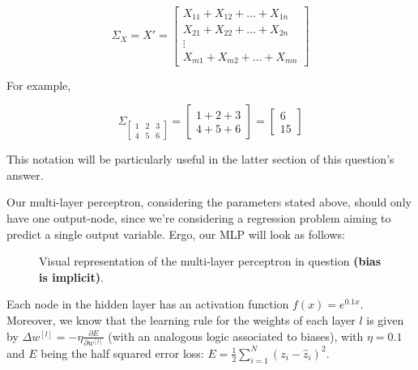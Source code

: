 \documentclass[12pt]{article}
\begin{document}
\begin{enumerate}[leftmargin=\labelsep]
        $$
          \Sigma_X = X' = \begin{bmatrix}
            X_{11} + X_{12} + \hdots + X_{1n} \\
            X_{21} + X_{22} + \hdots + X_{2n} \\
            \vdots                            \\
            X_{m1} + X_{m2} + \hdots + X_{mn}
          \end{bmatrix}
        $$

        For example,

        $$
          \Sigma_{\begin{bmatrix}
              1 & 2 & 3 \\
              4 & 5 & 6
            \end{bmatrix}} = \begin{bmatrix}
            1 + 2 + 3 \\
            4 + 5 + 6
          \end{bmatrix} = \begin{bmatrix}
            6 \\
            15
          \end{bmatrix}
        $$

        This notation will be particularly useful in the latter section of this
        question's answer.

        Our multi-layer perceptron, considering the parameters stated above, should only
        have one output-node, since we're considering a regression problem aiming to
        predict a single output variable. Ergo, our MLP will look as follows:

        \begin{figure}[H]
          \centering
          
          \caption{Visual representation of the multi-layer perceptron in question \textbf{(bias is implicit)}.}
        \end{figure}

        Each node in the hidden layer has an activation function $f(x) = e^{0.1x}$.
        Moreover, we know that the learning rule for the weights of each layer $l$
        is given by $\Delta w^{[l]} = - \eta \frac{\partial E}{\partial w^{[l]}}$ (with an analogous
        logic associated to biases), with $\eta = 0.1$ and $E$ being the half squared error loss:
        $E = \frac{1}{2} \sum_{i=1}^N (z_i - \hat{z}_i)^2$.

        \pagebreak


\end{enumerate}
\end{document}
